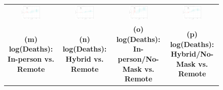 \documentclass[9pt,twocolumn,twoside,lineno]{pnas-new}
\begin{document}
\begin{figure}[!ht]
{\begin{minipage}{\linewidth}
\begin{tabular}{cccc}
 \includegraphics[width=0.4\textwidth]{event_logcases_csfull.pdf}& \includegraphics[width=0.4\textwidth]{event_logcases_cshybrid.pdf} & \includegraphics[width=0.4\textwidth]{event_logcases_csfullno.pdf}& \includegraphics[width=0.4\textwidth]{event_logcases_cshybridno.pdf}\smallskip\\
\textbf{\large (m) log(Deaths): In-person vs. Remote }&\textbf{\large (n) log(Deaths):  Hybrid vs. Remote }&\textbf{\large (o) log(Deaths): In-person/No-Mask vs. Remote}&\textbf{\large (p) log(Deaths):  Hybrid/No-Mask vs. Remote }\smallskip\\

\end{tabular}
\end{minipage}}
\end{figure}
\end{document}
